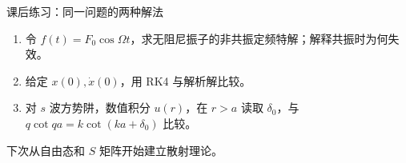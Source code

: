 \documentclass[aspectratio=169,11pt]{beamer}
\begin{document}
\begin{frame}{课后练习：同一问题的两种解法}
\begin{enumerate}
\item 令 $f(t)=F_0\cos\Omega t$，求无阻尼振子的非共振定频特解；解释共振时为何失效。
\item 给定 $x(0),\dot x(0)$，用 RK4 与解析解比较。
\item 对 $s$ 波方势阱，数值积分 $u(r)$，在 $r>a$ 读取 $\delta_0$，与 $q\cot qa=k\cot(ka+\delta_0)$ 比较。
\end{enumerate}
下次从自由态和 $S$ 矩阵开始建立散射理论。
\end{frame}
\end{document}
